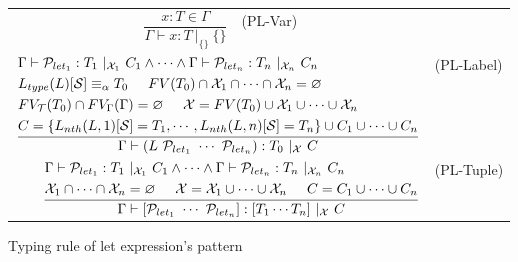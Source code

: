 \documentclass{article}
\begin{document}
\begin{figure}
    \centering
    \begin{tabular}{rlrl}
        $\dfrac{x : T \in \Gamma}{\Gamma \vdash x : T\ |_{\{\}}\ \{\}}$ & (PL-Var) \vspace{5mm} \\

        \multicolumn{3}{r}{
        $\dfrac{
        \begin{aligned}
        &\Gamma \vdash \mathcal{P}_{let_1} : T_1\ |_{\mathcal{X}_1}\ C_1 \land \cdots \land
        \Gamma \vdash \mathcal{P}_{let_n} : T_n\ |_{\mathcal{X}_n}\ C_n \\
        &L_{type}(L)[\mathcal{S}]\equiv_\alpha T_0 \hspace{5mm} FV(T_0) \cap \mathcal{X}_1 \cap \cdots \cap \mathcal{X}_n = \varnothing \\
        &FV_\mathcal{T}(T_0) \cap FV_\Gamma(\Gamma) = \varnothing \hspace{5mm}
        \mathcal{X} = FV(T_0) \cup \mathcal{X}_1 \cup \cdots \cup \mathcal{X}_n \\
        &C = \{L_{nth}(L, 1)[\mathcal{S}] = T_1, \cdots, L_{nth}(L, n)[\mathcal{S}] = T_n\} \cup C_1 \cup \cdots \cup C_n
        \end{aligned}
        }{\Gamma \vdash (L\ \mathcal{P}_{let_1}\ \cdots\ \mathcal{P}_{let_n}) : T_0\ |_{\mathcal{X}}\ C}$} & (PL-Label) \vspace{5mm} \\

        \multicolumn{3}{r}{
        $\dfrac{
        \begin{aligned}
        &\Gamma \vdash \mathcal{P}_{let_1} : T_1\ |_{\mathcal{X}_1}\ C_1 \land \cdots \land
        \Gamma \vdash \mathcal{P}_{let_n} : T_n\ |_{\mathcal{X}_n}\ C_n \\
        &\mathcal{X}_1 \cap \cdots \cap \mathcal{X}_n = \varnothing \hspace{5mm}
        \mathcal{X} = \mathcal{X}_1 \cup \cdots \cup \mathcal{X}_n \hspace{5mm}
        C = C_1 \cup \cdots \cup C_n
        \end{aligned}
        }{\Gamma \vdash [\mathcal{P}_{let_1}\ \cdots\ \mathcal{P}_{let_n}] : [T_1 \cdots T_n]\ |_{\mathcal{X}}\ C}$} & (PL-Tuple) \\
    \end{tabular}
    \caption{Typing rule of let expression's pattern}
\end{figure}
\end{document}
